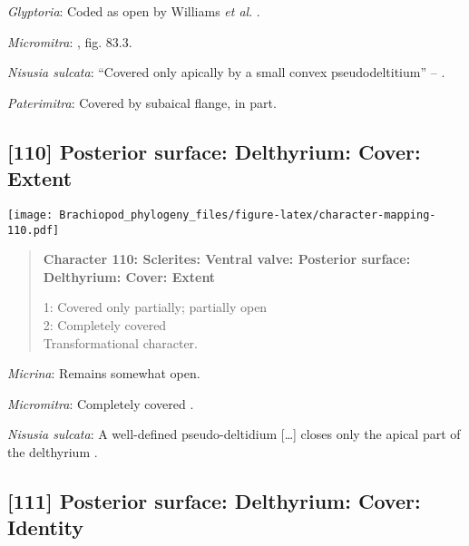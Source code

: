 \documentclass[openany]{book}
\theoremstyle{definition}
\theoremstyle{definition}
\theoremstyle{definition}
\theoremstyle{remark}
\begin{document}
\hypertarget{Glyptoria-coding-109}{}
\emph{Glyptoria}: Coded as open by Williams \emph{et al}.
\citeyearpar{Williams1998Thediversity}.

\hypertarget{Micromitra-coding-109}{}
\emph{Micromitra}: \citet{Williams2000LinguliformeaCraniiformea}, fig.
83.3.

\hypertarget{Nisusia_sulcata-coding-109}{}
\emph{Nisusia sulcata}: ``Covered only apically by a small convex
pseudodeltitium'' -- \citet{Holmer2018Evolutionarysignificance}.

\hypertarget{Paterimitra-coding-109}{}
\emph{Paterimitra}: Covered by subaical flange, in part.

\subsection*{{[}110{]} Posterior surface: Delthyrium: Cover:
Extent}\label{posterior-surface-delthyrium-cover-extent}

\texttt{[image: Brachiopod\_phylogeny\_files/figure-latex/character-mapping-110.pdf]}

\begin{quote}
\textbf{Character 110: Sclerites: Ventral valve: Posterior surface:
Delthyrium: Cover: Extent}

1: Covered only partially; partially open\\
2: Completely covered\\
Transformational character.
\end{quote}

\hypertarget{Micrina-coding-110}{}
\emph{Micrina}: Remains somewhat open.

\hypertarget{Micromitra-coding-110}{}
\emph{Micromitra}: Completely covered \citep[fig.
83.3]{Williams2000LinguliformeaCraniiformea}.

\hypertarget{Nisusia_sulcata-coding-110}{}
\emph{Nisusia sulcata}: A well-defined pseudo-deltidium {[}\ldots{}{]}
closes only the apical part of\\
the delthyrium \citep{Rowell1985Theevolutionary}.

\subsection*{{[}111{]} Posterior surface: Delthyrium: Cover:
Identity}\label{posterior-surface-delthyrium-cover-identity}
\end{document}
